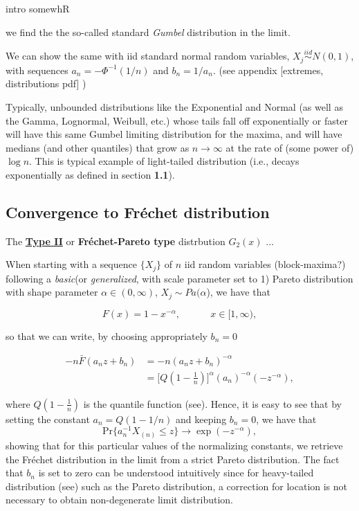 \documentclass[11pt,a4paper,openany ]{book}
\begin{document}
intro \cite{falk_laws_2011} somewhR

we find the the so-called standard \emph{Gumbel} distribution in the limit. 

We can show the same with iid standard normal random variables, $X_j\stackrel{iid}{\sim}N(0,1)$, with sequences $a_n=-\Phi^{-1}(1/n)$ and $b_n=1/a_n$. (see appendix [extremes, distributions  pdf] )

Typically, unbounded distributions like the Exponential and Normal (as well
as the Gamma, Lognormal, Weibull, etc.) whose tails fall off exponentially
or faster will have this same Gumbel limiting distribution for the maxima,
and will have medians (and other quantiles) that grow as $n\rightarrow\infty$ at the rate
of (some power of) $\log n$. This is typical example of light-tailed distribution (i.e., decays exponentially as defined in section \textbf{1.1}).

\subsection*{Convergence to Fréchet distribution}

The \textbf{\underline{Type II}} or \textbf{Fréchet-Pareto type} distrbution $G_2(x)$  ...

When starting with a sequence $\{X_j\}$ of $n$ iid random variables (block-maxima?) following a \textit{basic}(or \textit{generalized}, with scale parameter set to 1) Pareto distribution with shape parameter $\alpha\in (0,\infty)$, $X_j\sim Pa(\alpha$), we have that 

\begin{equation}
F(x)=1-x^{-\alpha}, \ \ \ \ \ \ \ \ \ \ \ \ \ \ x\in[1,\infty),
\end{equation}

so that we can write, by choosing appropriately $b_n=0$

\begin{equation*}
\begin{aligned}
-n\bar{F}(a_nz+b_n)
& =-n(a_nz+b_n)^{-\alpha} \\
& =\Big[Q(1-\frac{1}{n})\Big]^{\alpha}(a_n)^{-\alpha}(-z^{-\alpha}),
\end{aligned}
\end{equation*}

where $Q(1-\frac{1}{n})$ is the quantile function (see). Hence, it is easy to see that by setting the constant $a_n=Q(1-1/n)$ and keeping $b_n=0$, we have that 
\begin{equation*}
\text{Pr}\{a_n^{-1}X_{(n)}\leq z\}\rightarrow \exp (-z^{-\alpha}),
\end{equation*}
showing that for this particular values of the normalizing constants, we retrieve the Fréchet distribution in the limit from a strict Pareto distribution. The fact that $b_n$ is set to zero can be understood intuitively since for heavy-tailed distribution (see) such as the Pareto distribution, a correction for location is not necessary to obtain non-degenerate limit distribution. \cite[pp.51]{beirlant_practical_1996}
\end{document}
